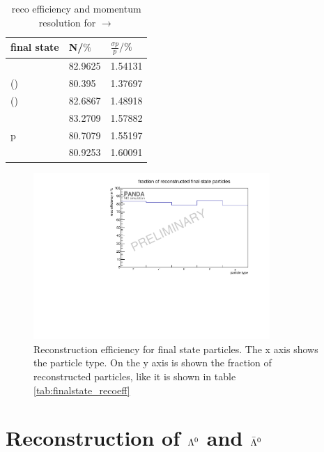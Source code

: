 	\begin{table}
		\centering
		\caption{\propose reco efficiency and momentum resolution for \pbarpSystem $\rightarrow$ \excitedanticascade \cascade}
		\label{tab:finalstate_recoeff_cc}
		\begin{tabular}{lll}
			\hline
			final state & N/$\%$ & $\frac{\sigma p}{p}/\%$ \\
			\hline
			\hline
			\piplus &  82.9625&   1.54131\\
			\piminusone(\cascade) & 80.395&   1.37697  \\
			\piminustwo(\lam) &  82.6867&   1.48918\\
			\kplus& 83.2709&   1.57882 \\
			p &  80.7079&   1.55197\\
			\antiproton &  80.9253&   1.60091\\\hline
			 
		\end{tabular}
	\end{table}
	
	\begin{figure}
	
		\centering
		\includegraphics[width=0.8\textwidth]{./plots/finalstate/reco_efficiency.pdf}
		\caption{\propose Reconstruction efficiency for final state particles. The x axis shows the particle type. 
				On the y axis is shown the fraction of reconstructed particles, like it is shown in table \ref{tab:finalstate_recoeff}}
		\label{fig:finalstate_recoeff}
	
	\end{figure}
	

	
\section{Reconstruction of $\boldmath{\Lambda}^0$ and $\boldmath{\bar{\Lambda}^0}$}
